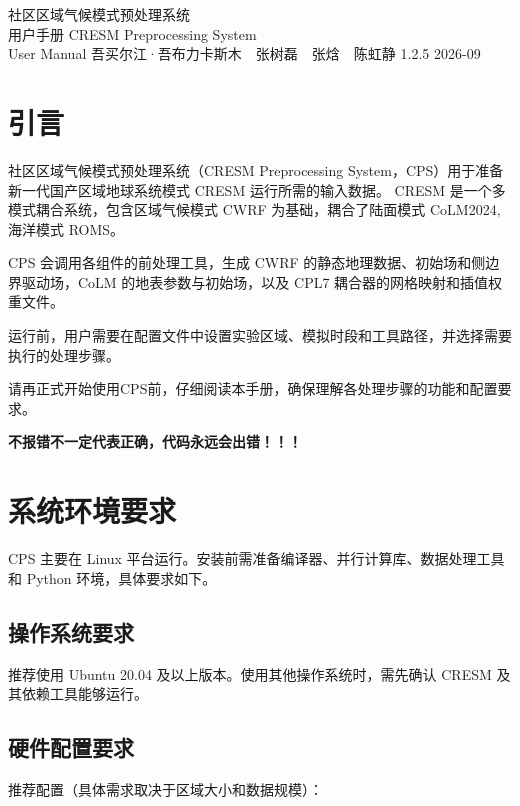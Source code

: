 \documentclass[UTF8,a4paper,11pt,fontset=none]{ctexart}
\begin{document}
\ManualCover
    {社区区域气候模式预处理系统\\用户手册}
    {CRESM Preprocessing System\\User Manual}
    {吾买尔江·吾布力卡斯木　张树磊　张焓　陈虹静}
    {1.2.5}
    {2026-09}

\ManualContents

\section{引言}

社区区域气候模式预处理系统（CRESM Preprocessing System，CPS）用于准备 新一代国产区域地球系统模式 CRESM 运行所需的输入数据。
CRESM 是一个多模式耦合系统，包含区域气候模式 CWRF 为基础，耦合了陆面模式 CoLM2024, 海洋模式 ROMS。

CPS 会调用各组件的前处理工具，生成 CWRF 的静态地理数据、初始场和侧边界驱动场，CoLM 的地表参数与初始场，以及 CPL7 耦合器的网格映射和插值权重文件。

运行前，用户需要在配置文件中设置实验区域、模拟时段和工具路径，并选择需要执行的处理步骤。

\begin{CPSEmphasis}[注意]
    请再正式开始使用CPS前，仔细阅读本手册，确保理解各处理步骤的功能和配置要求。

    \begin{center}
        \Large{\textbf{不报错不一定代表正确，代码永远会出错！！！}}
    \end{center}
\end{CPSEmphasis}


\section{系统环境要求}

CPS 主要在 Linux 平台运行。安装前需准备编译器、并行计算库、数据处理工具和 Python 环境，具体要求如下。

\subsection{操作系统要求}

推荐使用 Ubuntu 20.04 及以上版本。使用其他操作系统时，需先确认 CRESM 及其依赖工具能够运行。

\subsection{硬件配置要求}

推荐配置（具体需求取决于区域大小和数据规模）：
\end{document}
